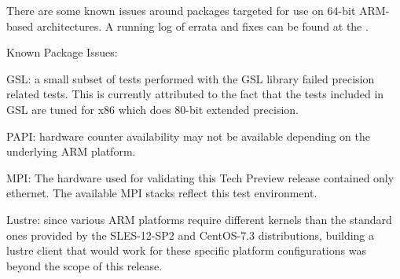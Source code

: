 There are some known issues around \OHPC{} packages targeted for use on 64-bit
ARM-based architectures. A running log of errata and
fixes can be found at the
\href{https://github.com/openhpc/ohpc/wiki/ARM-Tech-Preview}{\color{blue}{ARM Tech Preview Wiki}}.

\noindent Known Package Issues: 
\begin{itemize*}

\item GSL: a small subset of tests performed with the GSL library failed
precision related tests. This is currently attributed to the fact that the tests included
in GSL are tuned for x86 which does 80-bit extended precision.
\item PAPI: hardware counter availability may not be available depending on the
underlying ARM platform.
\item MPI: The hardware used for validating this Tech Preview release contained
only ethernet. The available MPI stacks reflect this test environment.
\item Lustre: since various ARM platforms require different kernels than the
standard ones provided by the SLES-12-SP2 and CentOS-7.3 distributions, 
building a lustre client that would work for these specific platform 
configurations was beyond the scope of this release.
\end{itemize*}

